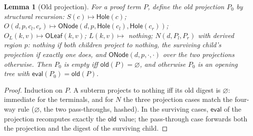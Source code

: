 \documentclass[twocolumn]{article}
\newtheorem{lemma}{Lemma}
\begin{document}
\begin{lemma}[Old projection]
\label{lem:proj}
For a proof term $P$, define the \emph{old projection} $P_0$ by structural recursion: $S(c) \mapsto \mathsf{Hole}(c)$; $O(d,p,c_l,c_r) \mapsto \mathsf{ONode}(d,p,\mathsf{Hole}(c_l),\mathsf{Hole}(c_r))$; $O_L(k,v) \mapsto \mathsf{OLeaf}(k,v)$; $L(k,v) \mapsto$ nothing; $N(d,P_l,P_r)$ with derived region $p$: nothing if both children project to nothing, the surviving child's projection if exactly one does, and $\mathsf{ONode}(d,p,\cdot,\cdot)$ over the two projections otherwise. Then $P_0$ is empty iff $\mathsf{old}(P) = \varnothing$, and otherwise $P_0$ is an opening tree with $\mathsf{eval}(P_0) = \mathsf{old}(P)$.
\end{lemma}
\begin{proof}
Induction on $P$. A subterm projects to nothing iff its old digest is $\varnothing$: immediate for the terminals, and for $N$ the three projection cases match the four-way rule ($\varnothing$, the two pass-throughs, hashed). In the surviving cases, $\mathsf{eval}$ of the projection recomputes exactly the $\mathsf{old}$ value; the pass-through case forwards both the projection and the digest of the surviving child.
\end{proof}
\end{document}

